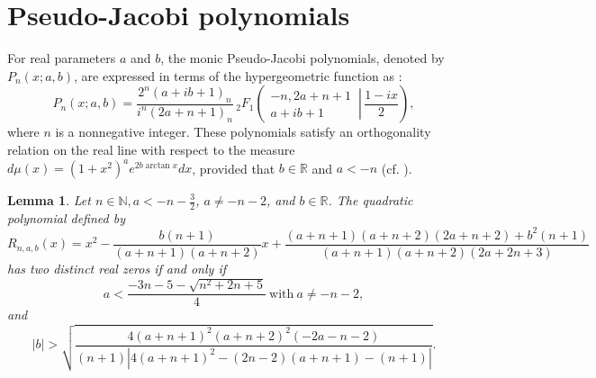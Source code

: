 \documentclass[final,3p,times,12pt]{elsarticle}
\newtheorem{lemma}{Lemma}[section]
\numberwithin{equation}{section}  %
\begin{document}
	\section{Pseudo-Jacobi polynomials}\label{Pseudo Jacobi polynomials}
	For real parameters $a$ and $b$, the monic Pseudo-Jacobi polynomials, denoted by $P_n(x; a, b)$, are expressed in terms of the hypergeometric function as \cite{Koekoek-Book-HypergeometricOP}:
	\begin{equation}
		P_n(x; a, b) = \frac{2^n(a + ib + 1)_n}{i^n(2a + n + 1)_n} \, {}_2F_1 \left( \left. \begin{matrix} -n, 2a + n + 1 \\ a + ib + 1 \end{matrix} \, \right| \, \frac{1 - ix}{2} \right),
	\end{equation}
	where $n$ is a nonnegative integer. These polynomials satisfy an orthogonality relation on the real line with respect to the measure $d\mu(x) = (1 + x^2)^a e^{2b \arctan x}dx$, provided that $b \in \mathbb{R}$ and $a < -n$ (cf. \cite{Jordaan-Tookos-JAT-2014}). %
	
	
	\begin{lemma}
		Let $n\in \mathbb{N}, 	a < -n - \frac{3}{2}$, $a\neq -n-2$, and $b \in \mathbb{R}$. The quadratic polynomial defined by
		\begin{equation}\label{Quadraticpolynomial-Pseudo-Jacobi-Interlacing}
			R_{n,a,b}(x) = x^2 - \frac{b(n+1)}{(a+n+1)(a+n+2)}x + \frac{(a+n+1)(a+n+2)(2a+n+2)+b^2(n+1)}{(a+n+1)(a+n+2)(2a+2n+3)}
		\end{equation}
		has two distinct real zeros if and only if		\begin{equation} \label{condition-a-realzeros}
			a < \frac{-3n - 5 - \sqrt{n^2+2n+5}}{4}~\text{with}~a\neq -n-2,
		\end{equation}
		and 
		\begin{equation} \label{condition-b-realzeros}
			|b| > \sqrt{ \frac{4(a+n+1)^2(a+n+2)^2(-2a-n-2)}{(n+1) \left| 4(a+n+1)^2 - (2n-2)(a+n+1) -(n+1) \right| } }.
		\end{equation}
	\end{lemma}
	 
\end{document}
